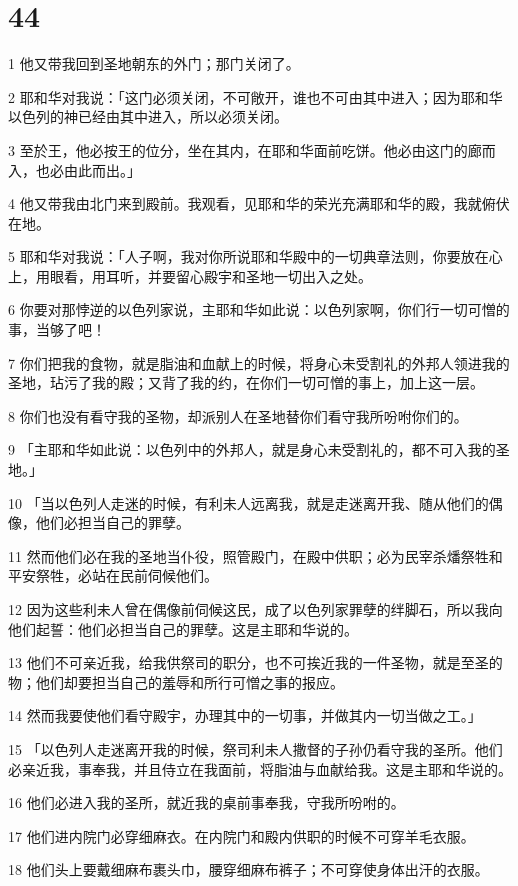 \chapter{44}

\par 1 他又带我回到圣地朝东的外门；那门关闭了。
\par 2 耶和华对我说：「这门必须关闭，不可敞开，谁也不可由其中进入；因为耶和华以色列的神已经由其中进入，所以必须关闭。
\par 3 至於王，他必按王的位分，坐在其内，在耶和华面前吃饼。他必由这门的廊而入，也必由此而出。」
\par 4 他又带我由北门来到殿前。我观看，见耶和华的荣光充满耶和华的殿，我就俯伏在地。
\par 5 耶和华对我说：「人子啊，我对你所说耶和华殿中的一切典章法则，你要放在心上，用眼看，用耳听，并要留心殿宇和圣地一切出入之处。
\par 6 你要对那悖逆的以色列家说，主耶和华如此说：以色列家啊，你们行一切可憎的事，当够了吧！
\par 7 你们把我的食物，就是脂油和血献上的时候，将身心未受割礼的外邦人领进我的圣地，玷污了我的殿；又背了我的约，在你们一切可憎的事上，加上这一层。
\par 8 你们也没有看守我的圣物，却派别人在圣地替你们看守我所吩咐你们的。
\par 9 「主耶和华如此说：以色列中的外邦人，就是身心未受割礼的，都不可入我的圣地。」
\par 10 「当以色列人走迷的时候，有利未人远离我，就是走迷离开我、随从他们的偶像，他们必担当自己的罪孽。
\par 11 然而他们必在我的圣地当仆役，照管殿门，在殿中供职；必为民宰杀燔祭牲和平安祭牲，必站在民前伺候他们。
\par 12 因为这些利未人曾在偶像前伺候这民，成了以色列家罪孽的绊脚石，所以我向他们起誓：他们必担当自己的罪孽。这是主耶和华说的。
\par 13 他们不可亲近我，给我供祭司的职分，也不可挨近我的一件圣物，就是至圣的物；他们却要担当自己的羞辱和所行可憎之事的报应。
\par 14 然而我要使他们看守殿宇，办理其中的一切事，并做其内一切当做之工。」
\par 15 「以色列人走迷离开我的时候，祭司利未人撒督的子孙仍看守我的圣所。他们必亲近我，事奉我，并且侍立在我面前，将脂油与血献给我。这是主耶和华说的。
\par 16 他们必进入我的圣所，就近我的桌前事奉我，守我所吩咐的。
\par 17 他们进内院门必穿细麻衣。在内院门和殿内供职的时候不可穿羊毛衣服。
\par 18 他们头上要戴细麻布裹头巾，腰穿细麻布裤子；不可穿使身体出汗的衣服。
